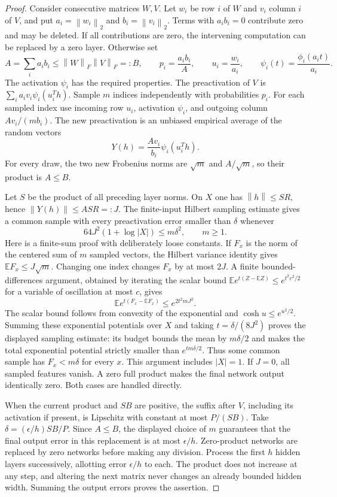 \documentclass[11pt]{article}
\theoremstyle{remark}
\newcommand{\E}{\mathbb E}
\newcommand{\norm}[1]{\left\lVert #1\right\rVert}
\begin{document}
\begin{proof}
Consider consecutive matrices $W,V$. Let $w_i$ be row $i$ of $W$ and
$v_i$ column $i$ of $V$, and put $a_i=\norm{w_i}_2$ and
$b_i=\norm{v_i}_2$. Terms with $a_i b_i=0$ contribute zero and may be
deleted. If all contributions are zero, the intervening computation
can be replaced by a zero layer. Otherwise set
\[
 A=\sum_i a_i b_i\le\norm W_F\norm V_F=:B,
 \qquad p_i=\frac{a_i b_i}{A},\qquad u_i=\frac{w_i}{a_i},
 \qquad \psi_i(t)=\frac{\phi_i(a_i t)}{a_i}.
\]
The activation $\psi_i$ has the required properties. The preactivation
of $V$ is $\sum_i a_i v_i\psi_i(u_i^T h)$.
Sample $m$ indices independently with probabilities $p_i$. For each
sampled index use incoming row $u_i$, activation $\psi_i$, and outgoing
column $A v_i/(m b_i)$. The new preactivation is an unbiased empirical
average of the random vectors
\[
 Y(h)=\frac{A v_i}{b_i}\psi_i(u_i^T h).
\]
For every draw, the two new Frobenius norms are $\sqrt m$ and
$A/\sqrt m$, so their product is $A\le B$.

Let $S$ be the product of all preceding layer norms. On $X$ one has
$\norm h\le SR$, hence $\norm{Y(h)}\le ASR=:J$.
The finite-input Hilbert sampling estimate gives a common sample
with every preactivation error smaller than $\delta$ whenever
\[
 64J^2(1+\log|X|)\le m\delta^2,\qquad m\ge1.
\]
Here is a finite-sum proof with deliberately loose constants. If
$F_x$ is the norm of the centered sum of $m$ sampled vectors, the
Hilbert variance identity gives $\E F_x\le J\sqrt m$.
Changing one index changes $F_x$ by at most $2J$. A finite
bounded-differences argument, obtained by iterating the scalar
bound $\E e^{t(Z-\E Z)}\le e^{t^2c^2/2}$ for a variable of
oscillation at most $c$, gives
\[
 \E e^{t(F_x-\E F_x)}\le e^{2t^2mJ^2}.
\]
The scalar bound follows from convexity of the exponential and
$\cosh u\le e^{u^2/2}$. Summing these exponential potentials
over $X$ and taking $t=\delta/(8J^2)$ proves the displayed
sampling estimate: its budget bounds the mean by $m\delta/2$
and makes the total exponential potential strictly smaller
than $e^{tm\delta/2}$. Thus some common sample has
$F_x<m\delta$ for every $x$. This argument includes $|X|=1$.
If $J=0$, all sampled features vanish. A zero full product
makes the final network output identically zero. Both cases
are handled directly.

When the current product and $SB$ are positive, the suffix after
$V$, including its activation if present, is Lipschitz with
constant at most $P/(SB)$. Take
$\delta=(\epsilon/h)SB/P$. Since $A\le B$, the displayed
choice of $m$ guarantees that the final output error in this
replacement is at most $\epsilon/h$. Zero-product networks
are replaced by zero networks before making any division.
Process the first $h$ hidden layers successively, allotting error
$\epsilon/h$ to each. The product does not increase at any step, and
altering the next matrix never changes an already bounded hidden
width. Summing the output errors proves the assertion.
\end{proof}
\end{document}
